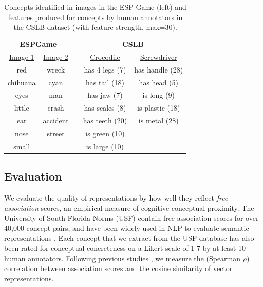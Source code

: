 \documentclass[11pt]{article}
\begin{document}
 \begin{table}[t]\begin{center}\begin{tabular}{c|ccc|c}


\multicolumn{2}{c}{\bf ESPGame} &\multicolumn{1}{c}{} & \multicolumn{2}{c}{\bf CSLB}\\
 \underline{Image 1} &  \underline{Image 2} & &  \underline{Crocodile} & \underline{Screwdriver} \\ 
\footnotesize{red} &  \footnotesize{wreck} &  &  \footnotesize{has 4 legs (7)} &  \footnotesize{has handle (28)} \\ 
\footnotesize{chihuaua} &  \footnotesize{cyan} & &  \footnotesize{has tail (18)} &  \footnotesize{has head (5)} \\ 
\footnotesize{eyes} &  \footnotesize{man} & &  \footnotesize{has jaw (7)} & \footnotesize{is long (9)} \\ 
\footnotesize{little} &  \footnotesize{crash} & &  \footnotesize{has scales (8)} &   \footnotesize{is plastic (18)} \\ 
\footnotesize{ear} &  \footnotesize{accident} & &  \footnotesize{has teeth (20)} & \footnotesize{is metal (28)} \\ 
\footnotesize{nose}  &  \footnotesize{street} & &  \footnotesize{is green (10}) &  \\ 
\footnotesize{small} &   & & \footnotesize{is large (10)} &    \\ 






\end{tabular}\end{center}\caption{\label{font-table} Concepts identified in images in the ESP Game (left) and features produced for concepts by human annotators in the CSLB dataset (with feature strength, max=30).}\end{table}







\subsection{Evaluation}

We evaluate the quality of representations by how well they reflect \emph{free association} scores, an empirical measure of cognitive conceptual proximity. The University of South Florida Norms (USF) \cite{nelson2004university} contain free association scores for over 40,000 concept pairs, and have been widely used in NLP to evaluate semantic representations \cite{andrews2009integrating,feng2010visual,silberer2012grounded,rollermultimodal}. Each concept that we extract from the USF database has also been rated for conceptual concreteness on a Likert scale of 1-7 by at least 10 human annotators. Following previous studies \cite{huang2012improving,silberer2012grounded}, we measure the (Spearman \(\rho\)) correlation between association scores and the cosine similarity of vector representations.
\end{document}
